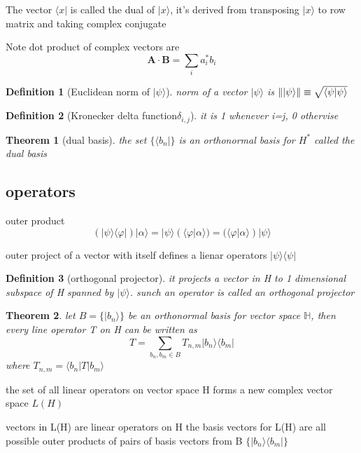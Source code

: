 \documentclass[10pt]{article}
\theoremstyle{break}
\newtheorem{thm}{Theorem}[subsection]
\newtheorem{defn}{Definition}[subsection]
\begin{document}
The vector $\langle x|$ is called the dual of $|x\rangle$, 
it's derived from transposing $|x\rangle$ to row matrix and taking complex conjugate

Note dot product of complex vectors are 
$$\mathbf{A}\cdot\mathbf{B}=\sum_i a_i^*b_i$$

\begin{defn}[Euclidean norm of $|\psi\rangle$]
    norm of a vector $|\psi\rangle$ is $\norm{|\psi\rangle}\equiv \sqrt{\langle\psi|\psi\rangle}$
\end{defn}


\begin{defn}[Kronecker delta function$\delta_{i,j}$]
    it is 1 whenever i=j, 0 othervise
\end{defn}

\begin{thm}[dual basis]
    the set $\{\langle b_n|\}$ is an orthonormal basis for $H^*$ called the dual basis
\end{thm}

\subsection{operators}

outer product 
$$(|\psi\rangle\langle\varphi|)|\alpha\rangle =
|\psi\rangle(\langle\varphi|\alpha\rangle) = 
(\langle\varphi|\alpha\rangle)|\psi\rangle$$

outer project of a vector with itself defines a lienar operators $|\psi\rangle\langle\psi|$

\begin{defn}[orthogonal projector]
    it projects a vector in H to 1 dimensional subspace of H spanned by 
    $|\psi\rangle$. sunch an operator is called an orthogonal projector
\end{defn}

\begin{thm}
    let $B=\{|b_n\rangle\}$ be an orthonormal basis for 
    vector space $\mathbb{H}$, then every line operator T on H can be written as 
    $$T=\sum_{b_n, b_m \in B}T_{n,m}|b_n\rangle\langle b_m|$$
    where $T_{n,m}=\langle b_n | T | b_m \rangle$
\end{thm}

the set of all linear operators on vector space H forms a new complex vector space $L(H)$

vectors in L(H) are linear operators on H 
the basis vectors for L(H) are all possible outer products of pairs of basis vectors from B $\{|b_n\rangle\langle b_m|\}$
\end{document}
